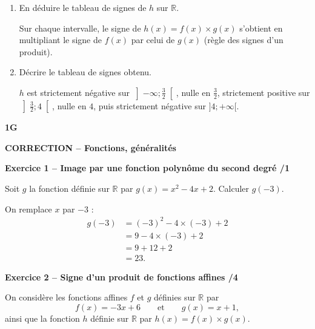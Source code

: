 \documentclass[10pt,a4paper]{article}
\renewcommand{\niveau}{1G}
\renewcommand{\chapitre}{Fonctions, généralités}
\renewcommand{\interroversion}[1]{
    \noindent\textbf{\niveau}

    \vspace{-0.5cm}
    \begin{center}
        \textbf{\large CORRECTION -- \chapitre}
    \end{center}

    \vspace{0.1cm}
}
\begin{document}
\begin{enumerate}
\item En déduire le tableau de signes de \(h\) sur \(\mathbb{R}\).

Sur chaque intervalle, le signe de \(h(x)=f(x)\times g(x)\) s'obtient en multipliant le signe de \(f(x)\) par celui de \(g(x)\) (règle des signes d'un produit).

\begin{center}
\end{center}

\item Décrire le tableau de signes obtenu.

\(h\) est strictement négative sur \(\left]-\infty;\frac{3}{2}\right[\), nulle en \(\frac{3}{2}\), strictement positive sur \(\left]\frac{3}{2};4\right[\), nulle en \(4\), puis strictement négative sur \(]4;+\infty[\).
\end{enumerate}

\newpage


\interroversion{B}

\textbf{Exercice 1 -- Image par une fonction polynôme du second degré \hfill /1}

Soit \(g\) la fonction définie sur \(\mathbb{R}\) par \(g(x)=x^2-4x+2\). Calculer \(g(-3)\).

On remplace \(x\) par \(-3\) :
\[
\begin{aligned}
g(-3) &= (-3)^2-4\times(-3)+2\\
      &= 9-4\times(-3)+2\\
      &= 9+12+2\\
      &= 23.
\end{aligned}
\]

\textbf{Exercice 2 -- Signe d'un produit de fonctions affines \hfill /4}

On considère les fonctions affines \(f\) et \(g\) définies sur \(\mathbb{R}\) par
\[
f(x)=-3x+6 \qquad\text{et}\qquad g(x)=x+1,
\]
ainsi que la fonction \(h\) définie sur \(\mathbb{R}\) par \(h(x)=f(x)\times g(x)\).
\end{document}
